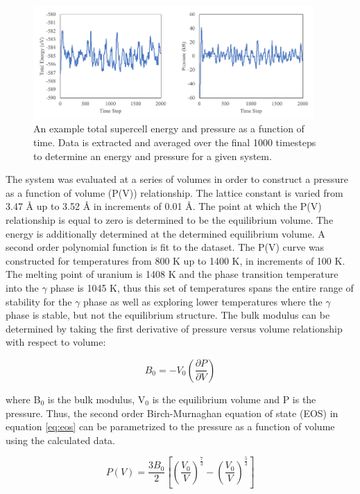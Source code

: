 \documentclass[review]{elsarticle}
\begin{document}
\begin{figure}[h]
 \centering
 \includegraphics[width=0.95\textwidth]{convergence.png} 
 \caption{An example total supercell energy and pressure as a function of time. Data is extracted and averaged over the final 1000 timesteps to determine an energy and pressure for a given system. }
 \label{fig:convergence}
\end{figure}

\FloatBarrier

The system was evaluated at a series of volumes in order to construct a pressure as a function of volume (P(V)) relationship. The lattice constant is varied from 3.47 {\AA} up to 3.52 {\AA} in increments of 0.01 {\AA}. The point at which the P(V) relationship is equal to zero is determined to be the equilibrium volume. The energy is additionally determined at the determined equilibrium volume. A second order polynomial function is fit to the dataset. The P(V) curve was constructed for temperatures from 800 K up to 1400 K, in increments of 100 K. The melting point of uranium is 1408 K and the phase transition temperature into the $\gamma$ phase is 1045 K, thus this set of temperatures spans the entire range of stability for the $\gamma$ phase as well as exploring lower temperatures where the $\gamma$ phase is stable, but not the equilibrium structure. The bulk modulus can be determined by taking the first derivative of pressure versus volume relationship with respect to volume:

\begin{equation}
\label{eq:bulk}
B_{0} = -V_0 \left( \frac{\partial P}{\partial V} \right)
\end{equation}

where B$_0$ is the bulk modulus, V$_0$ is the equilibrium volume and P is the pressure. Thus, the second order Birch-Murnaghan equation of state (EOS) in equation \ref{eq:eos} can be parametrized to the pressure as a function of volume using the calculated data. 

\begin{equation}
\label{eq:eos}
P(V) = \frac{3B_0}{2} \left[ \left(\frac{V_0}{V}\right)^{\frac{7}{3}} - \left(\frac{V_0}{V}\right)^{\frac{5}{3}} \right]
\end{equation}
\end{document}
